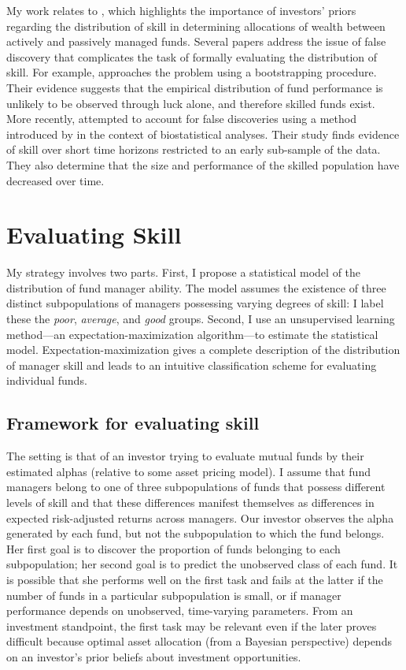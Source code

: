 	My work relates to \citet{Baks2001}, which highlights the importance of investors' priors regarding the distribution of skill in determining allocations of wealth between actively and passively managed funds. Several papers address the issue of false discovery that complicates the task of formally evaluating the distribution of skill. For example, \citet{Kosowski2006} approaches the problem using a bootstrapping procedure. Their evidence suggests that the empirical distribution of fund performance is unlikely to be observed through luck alone, and therefore skilled funds exist. More recently, \citet{Barras2010} attempted to account for false discoveries using a method introduced by \citet{Storey2002} in the context of biostatistical analyses. Their study finds evidence of skill over short time horizons restricted to an early sub-sample of the data. They also determine that the size and performance of the skilled population have decreased over time.


\section{Evaluating Skill}
	My strategy involves two parts.  First, I propose a statistical model of the distribution of fund manager ability.  The model assumes the existence of three distinct subpopulations of managers possessing varying degrees of skill: I label these the \textit{poor}, \textit{average}, and \textit{good} groups. Second, I use an unsupervised learning method---an expectation-maximization algorithm---to estimate the statistical model.  Expectation-maximization gives a complete description of the distribution of manager skill and leads to an intuitive classification scheme for evaluating individual funds.

	\subsection{Framework for evaluating skill}
		The setting is that of an investor trying to evaluate mutual funds by their estimated alphas (relative to some asset pricing model). I assume that fund managers belong to one of three subpopulations of funds that possess different levels of skill and that these differences manifest themselves as differences in expected risk-adjusted returns across managers. Our investor observes the alpha generated by each fund, but not the subpopulation to which the fund belongs. Her first goal is to discover the proportion of funds belonging to each subpopulation; her second goal is to predict the unobserved class of each fund. It is possible that she performs well on the first task and fails at the latter if the number of funds in a particular subpopulation is small, or if manager performance depends on unobserved, time-varying parameters. From an investment standpoint, the first task may be relevant even if the later proves difficult because optimal asset allocation (from a Bayesian perspective) depends on an investor's prior beliefs about investment opportunities.


